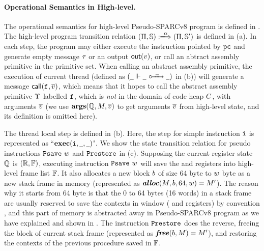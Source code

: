\paragraph{\textbf{Operational Semantics in High-level.}} 
The operational semantics for high-level Pseudo-SPARCv8 program 
is defined in \Fig{\ref{fig:selected-opsem-high-level-prog}}. 
The high-level program transition relation 
$\HGlobTrans{(\HMd, \hpstate)}{\hmsg}{(\HMd, \hpstate')}$ is defined 
in \Fig{\ref{fig:selected-opsem-high-level-prog}} (a). In each step, 
the program may either execute the instruction pointed by $\texttt{pc}$   
and generate empty message $\tau$ or an output $\textsf{out}({v})$, 
or call  an abtract assembly primitive in the primitive set.
When calling an abstract assembly primitive, 
the execution of current thread (defined as 
$(\hlocalstep{\notCare}{\notCare}{\ \notCare \ }{\notCare})$ in 
\Fig{\ref{fig:selected-opsem-high-level-prog}} (b)) will generate 
a message $\textsf{call}({\texttt{f}_{}, \overline{v}})$, which means that it 
hopes to call the abstract assembly primitive $\Upsilon$ labelled 
$\texttt{f}_{}$, which is {\it not} in the domain of code heap $C$, 
with arguments $\overline{v}$ 
(we use $\textbf{args}(\mathbb{Q}, M, \overline{v})$ 
to get arguments $\overline{v}$ 
from high-level state, and its definition is omitted here). 

The thread local step is defined in  
\Fig{\ref{fig:selected-opsem-high-level-prog}} (b). 
Here, the step for simple instruction $\texttt{i}{}$ is 
represented as ``$\textbf{exec}({\texttt{i}{}}, {\underline{\ \,}}, {\underline{\ \,}})$". 
We show the state transition relation for pseudo instructions 
$\texttt{Psave} \ w$ and $\texttt{Prestore}$ in 
\Fig{\ref{fig:selected-opsem-high-level-prog}} (c). 
Supposing the current register state $\mathbb{Q}$ is 
$(\mathbb{R}, \mathbb{F})$, executing instruction
$\texttt{Psave} \ w$ will save the \localRN{} and \inRN{} registers 
into high-level frame list $\mathbb{F}$. It also allocates 
a new block $b$ of size 64 byte to $w$ byte  
as a new stack frame in memory 
(represented as $\textbf{\textit{alloc}}(M, b, 64, w) = M'$). 
The reason why it starts from 64 byte is that the 0 to 64 bytes 
(16 words) in a stack frame are usually reserved to save 
the contexts in window (\localRN{} and \inRN{} registers)
by convention \cite{sparc},   
and this part of memory is abstracted away in 
Pseudo-SPARCv8 program as we have explained and shown in 
\Fig{\ref{fig:Abstraction of Register Windows and Memory}}.
The instruction $\texttt{Prestore}$ does the reverse, 
freeing the block of current stack frame
(represented as $\textbf{\textit{free}}(b, M) = M'$), and 
restoring the contexts of the previous procedure saved in $\mathbb{F}$. 

